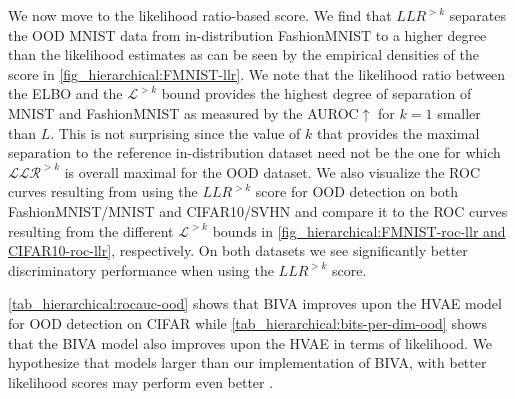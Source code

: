 {We now move to the likelihood ratio-based score.
We find that $LLR^{>k}$ separates the OOD MNIST data from in-distribution FashionMNIST to a higher degree than the likelihood estimates as can be seen by the empirical densities of the score in \cref{fig_hierarchical:FMNIST-llr}.
We note that the likelihood ratio between the ELBO and the $\mathcal{L}^{>k}$ bound provides the highest degree of separation of MNIST and FashionMNIST as measured by the AUROC$\uparrow$ for $k=1$ smaller than $L$.
This is not surprising since the value of $k$ that provides the maximal separation to the reference in-distribution dataset need not be the one for which $\mathcal{LLR}^{>k}$ is overall maximal for the OOD dataset.
We also visualize the ROC curves resulting from using the $LLR^{>k}$ score for OOD detection on both FashionMNIST/MNIST and CIFAR10/SVHN and compare it to the ROC curves resulting from the different $\mathcal{L}^{>k}$ bounds in \cref{fig_hierarchical:FMNIST-roc-llr and CIFAR10-roc-llr}, respectively.
On both datasets we see significantly better discriminatory performance when using the $LLR^{>k}$ score.

\cref{tab_hierarchical:rocauc-ood} shows that BIVA improves upon the HVAE model for OOD detection on CIFAR while \cref{tab_hierarchical:bits-per-dim-ood} shows that the BIVA model also improves upon the HVAE in terms of likelihood.
We hypothesize that models larger than our implementation of BIVA, with better likelihood scores may perform even better \parencite{maaloe_biva_2019, vahdat_nvae_2020, child_very_2021}.

}
